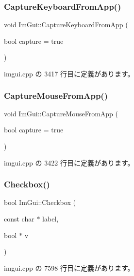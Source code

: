 \subsubsection{\texorpdfstring{Capture\+Keyboard\+From\+App()}{CaptureKeyboardFromApp()}}
{\footnotesize\ttfamily void Im\+Gui\+::\+Capture\+Keyboard\+From\+App (\begin{DoxyParamCaption}\item[{bool}]{capture = {\ttfamily true} }\end{DoxyParamCaption})}



 imgui.\+cpp の 3417 行目に定義があります。

\mbox{\label{namespace_im_gui_a3a86fbf0d334b30dc16fb44955f1ce54}} 
\subsubsection{\texorpdfstring{Capture\+Mouse\+From\+App()}{CaptureMouseFromApp()}}
{\footnotesize\ttfamily void Im\+Gui\+::\+Capture\+Mouse\+From\+App (\begin{DoxyParamCaption}\item[{bool}]{capture = {\ttfamily true} }\end{DoxyParamCaption})}



 imgui.\+cpp の 3422 行目に定義があります。

\mbox{\label{namespace_im_gui_a57d73c1d0ef807fef734d91024092027}} 
\subsubsection{\texorpdfstring{Checkbox()}{Checkbox()}}
{\footnotesize\ttfamily bool Im\+Gui\+::\+Checkbox (\begin{DoxyParamCaption}\item[{const char $\ast$}]{label,  }\item[{bool $\ast$}]{v }\end{DoxyParamCaption})}



 imgui.\+cpp の 7598 行目に定義があります。

